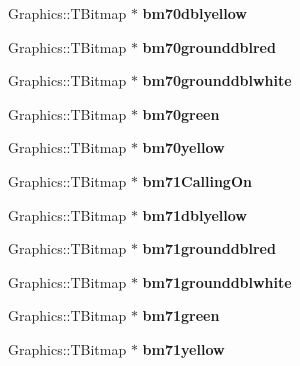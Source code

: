 \begin{DoxyCompactItemize}
Graphics\+::\+T\+Bitmap $\ast$ {\bfseries bm70dblyellow}
\item 
\mbox{\label{class_t_rail_graphics_a6dfd165ff9969b88045292358cebca74}} 
Graphics\+::\+T\+Bitmap $\ast$ {\bfseries bm70grounddblred}
\item 
\mbox{\label{class_t_rail_graphics_aa61cf0b052309857eb80b045b8c5628e}} 
Graphics\+::\+T\+Bitmap $\ast$ {\bfseries bm70grounddblwhite}
\item 
\mbox{\label{class_t_rail_graphics_a293015a6a3656f3e2639570518cca14f}} 
Graphics\+::\+T\+Bitmap $\ast$ {\bfseries bm70green}
\item 
\mbox{\label{class_t_rail_graphics_a49f8d33a213c7cacae91949c490cfe0c}} 
Graphics\+::\+T\+Bitmap $\ast$ {\bfseries bm70yellow}
\item 
\mbox{\label{class_t_rail_graphics_a594a761b0774ab9a084bdf5e8675afa6}} 
Graphics\+::\+T\+Bitmap $\ast$ {\bfseries bm71\+Calling\+On}
\item 
\mbox{\label{class_t_rail_graphics_a1db4e6a5cb8bd461c0a18ec22c10deec}} 
Graphics\+::\+T\+Bitmap $\ast$ {\bfseries bm71dblyellow}
\item 
\mbox{\label{class_t_rail_graphics_ad215d2b3048f2e00046e56df9e91be7e}} 
Graphics\+::\+T\+Bitmap $\ast$ {\bfseries bm71grounddblred}
\item 
\mbox{\label{class_t_rail_graphics_a25c4dcb2dc3ff03d693175f2d3a03326}} 
Graphics\+::\+T\+Bitmap $\ast$ {\bfseries bm71grounddblwhite}
\item 
\mbox{\label{class_t_rail_graphics_a0b3bf82b43869dc212c11a8da08d0c0e}} 
Graphics\+::\+T\+Bitmap $\ast$ {\bfseries bm71green}
\item 
\mbox{\label{class_t_rail_graphics_aed2196756b7aa3a0ebce3452d50d6d88}} 
Graphics\+::\+T\+Bitmap $\ast$ {\bfseries bm71yellow}
\item 
\mbox{\label{class_t_rail_graphics_ac958a77b1cddd7eed974c7592592a467}} 

\end{DoxyCompactItemize}
